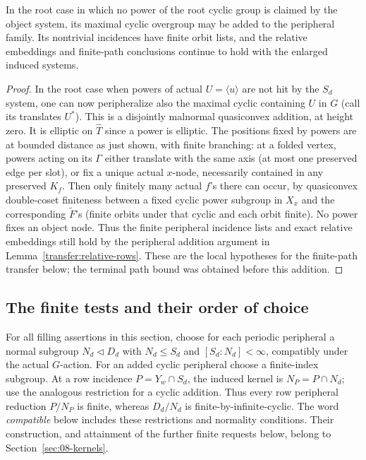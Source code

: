 \begin{corollary}\label{transfer:root-cyclic}
In the root case in which no power of the root cyclic group is claimed by the object system, its maximal cyclic overgroup may be added to the peripheral family. Its nontrivial incidences have finite orbit lists, and the relative embeddings and finite-path conclusions continue to hold with the enlarged induced systems.
\end{corollary}
\begin{proof}
In the root case when powers of actual \(U=\langle u\rangle\) are not hit by the \(S_d\) system, one can now peripheralize also the maximal cyclic containing \(U\) in \(G\) (call its translates \(U^*\)). This is a disjointly malnormal quasiconvex addition, at height zero. It is elliptic on \(\widehat T\) since a power is elliptic. The positions fixed by powers are at bounded distance as just shown, with finite branching: at a folded vertex, powers acting on its \(\Gamma\) either translate with the same axis (at most one preserved edge per slot), or fix a unique actual \(x\)-node, necessarily contained in any preserved \(K_f\). Then only finitely many actual \(f\)'s there can occur, by quasiconvex double-coset finiteness between a fixed cyclic power subgroup in \(X_x\) and the corresponding \(\widetilde F\)'s (finite orbits under that cyclic and each orbit finite). No power fixes an object node. Thus the finite peripheral incidence lists and exact relative embeddings still hold by the peripheral addition argument in Lemma~\ref{transfer:relative-rows}. These are the local hypotheses for the finite-path transfer below; the terminal path bound was obtained before this addition.

\end{proof}

\subsection{The finite tests and their order of choice}

For all filling assertions in this section, choose for each periodic peripheral a normal subgroup \(N_d\lhd D_d\) with \(N_d\le S_d\) and \([S_d:N_d]<\infty\), compatibly under the actual \(G\)-action. For an added cyclic peripheral choose a finite-index subgroup. At a row incidence \(P=Y_w\cap S_d\), the induced kernel is \(N_P=P\cap N_d\); use the analogous restriction for a cyclic addition. Thus every row peripheral reduction \(P/N_P\) is finite, whereas \(D_d/N_d\) is finite-by-infinite-cyclic. The word \emph{compatible} below includes these restrictions and normality conditions. Their construction, and attainment of the further finite requests below, belong to Section~\ref{sec:08-kernels}.

